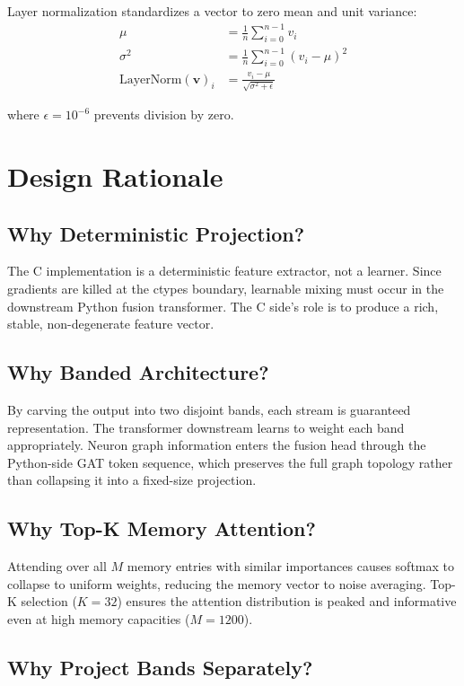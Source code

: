 \documentclass[12pt]{article}
\begin{document}
Layer normalization standardizes a vector to zero mean and unit variance:
\begin{align}
\mu &= \frac{1}{n} \sum_{i=0}^{n-1} v_i \\
\sigma^2 &= \frac{1}{n} \sum_{i=0}^{n-1} (v_i - \mu)^2 \\
\text{LayerNorm}(\mathbf{v})_i &= \frac{v_i - \mu}{\sqrt{\sigma^2 + \epsilon}}
\end{align}

where $\epsilon = 10^{-6}$ prevents division by zero.

\section{Design Rationale}

\subsection{Why Deterministic Projection?}

The C implementation is a deterministic feature extractor, not a learner.
Since gradients are killed at the ctypes boundary, learnable mixing must
occur in the downstream Python fusion transformer. The C side's role is
to produce a rich, stable, non-degenerate feature vector.

\subsection{Why Banded Architecture?}

By carving the output into two disjoint bands, each stream is
guaranteed representation. The transformer downstream learns to weight
each band appropriately. Neuron graph information enters the fusion head
through the Python-side GAT token sequence, which preserves the full
graph topology rather than collapsing it into a fixed-size projection.

\subsection{Why Top-K Memory Attention?}

Attending over all $M$ memory entries with similar importances causes
softmax to collapse to uniform weights, reducing the memory vector to
noise averaging. Top-K selection ($K = 32$) ensures the attention
distribution is peaked and informative even at high memory capacities
($M = 1200$).

\subsection{Why Project Bands Separately?}
\end{document}
